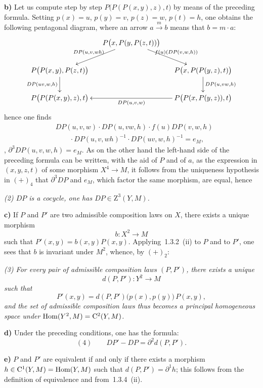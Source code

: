 \textbf{b)} Let us compute step by step \(P\bigl(P(P(x,y),z),t\bigr)\) by
means of the preceding formula. Setting \(p(x)=u\), \(p(y)=v\),
\(p(z)=w\), \(p(t)=h\), one
obtains{\renewcommand{\thefootnote}{(51)}}
the following pentagonal diagram, where an arrow
\(a\xrightarrow{m}b\) means that \(b=m\cdot a\):
\[
\xymatrix@C=1.4em@R=2.1em{
& P\bigl(x,P(y,P(z,t))\bigr)
  \ar[dl]_{DP(u,v,wh)}
  \ar[dr]^{f(u)(DP(v,w,h))}
& \\
P\bigl(P(x,y),P(z,t)\bigr) \ar[d]_{DP(uv,w,h)}
& &
P\bigl(x,P(P(y,z),t)\bigr) \ar[d]^{DP(u,vw,h)}
\\
P\bigl(P(P(x,y),z),t\bigr)
& &
P\bigl(P(x,P(y,z)),t\bigr) \ar[ll]^{DP(u,v,w)}
}
\]
hence one finds
\[
\begin{aligned}
&DP(u,v,w)\cdot DP(u,vw,h)\cdot f(u)DP(v,w,h)\\
&\qquad\cdot DP(u,v,wh)^{-1}\cdot DP(uv,w,h)^{-1}=e_{M},
\end{aligned}
\]
\ie, \(\partial^{3}DP(u,v,w,h)=e_{M}\). As on the other hand the left-hand
side of the preceding formula can be written, with the aid of \(P\) and of
\(a\), as the expression in \((x,y,z,t)\) of some morphism
\(X^{4}\to M\), it follows from the uniqueness hypothesis in \((+)_4\) that
\(\partial^{3}DP\) and \(e_{M}\), which factor the same morphism, are equal,
hence

\emph{(2) \(DP\) is a cocycle, \ie one has
\(DP\in\mathrm{Z}^{3}(Y,M)\).}

\textbf{c)} If \(P\) and \(P'\) are two admissible composition laws on \(X\),
there exists a unique morphism
\[
b\colon X^{2}\longrightarrow M
\]
such that \(P'(x,y)=b(x,y)P(x,y)\). Applying~1.3.2~(ii) to \(P\) and to
\(P'\), one sees that \(b\) is invariant under \(M^{2}\), whence, by
\((+)_2\):

\emph{(3) For every pair of admissible composition laws \((P,P')\), there
exists a unique}
\[
d(P,P')\colon Y^{2}\to M
\]
\emph{such that}
\[
P'(x,y)=d(P,P')\bigl(p(x),p(y)\bigr)\,P(x,y),
\]
\emph{and the set of admissible composition laws thus becomes a principal
homogeneous space under \(\operatorname{Hom}(Y^{2},M)=\mathrm{C}^{2}(Y,M)\).}

\textbf{d)} Under the preceding conditions, one has the formula:
\[
(4)\qquad DP'-DP=\partial^{2}d(P,P').
\]

\textbf{e)} \(P\) and \(P'\) are equivalent if and only if there exists a
morphism \(h\in\mathrm{C}^{1}(Y,M)=\operatorname{Hom}(Y,M)\) such that
\(d(P,P')=\partial^{1}h\); this follows from the definition of equivalence
and from~1.3.4~(ii).

